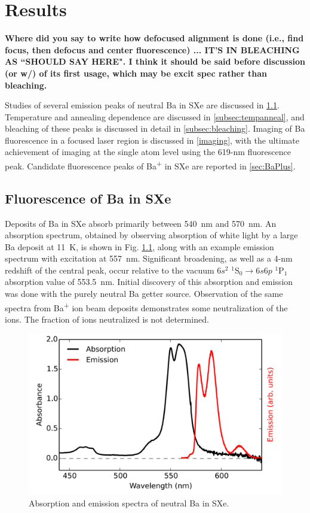 \chapter{Results}

\textbf{\color{red}Where did you say to write how defocused alignment is done (i.e., find focus, then defocus and center fluorescence) ... IT'S IN BLEACHING AS ``SHOULD SAY HERE".  I think it should be said before discussion (or w/) of its first usage, which may be excit spec rather than bleaching.}

Studies of several emission peaks of neutral Ba in SXe are discussed in \ref{sec:fluorescence}.  Temperature and annealing dependence are discussed in \ref{subsec:tempanneal}, and bleaching of these peaks is discussed in detail in \ref{subsec:bleaching}.  Imaging of Ba fluorescence in a focused laser region is discussed in \ref{imaging}, with the ultimate achievement of imaging at the single atom level using the 619-nm fluorescence peak.  Candidate fluorescence peaks of Ba\textsuperscript{+} in SXe are reported in \ref{sec:BaPlus}.

\section{Fluorescence of Ba in SXe}
\label{sec:fluorescence}

Deposits of Ba in SXe absorb primarily between 540~nm and 570~nm.  An absorption spectrum, obtained by observing absorption of white light by a large Ba deposit at 11~K, is shown in Fig. \ref{fig:BaAbs}, along with an example emission spectrum with excitation at 557~nm.  Significant broadening, as well as a 4-nm redshift  of the central peak, occur relative to the vacuum $6s^{2}$ $^{1}$S$_{0} \rightarrow 6s6p$ $^{1}$P$_{1}$ absorption value of 553.5~nm.  Initial discovery of this absorption and emission was done with the purely neutral Ba getter source.  Observation of the same spectra from Ba\textsuperscript{+} ion beam deposits demonstrates some neutralization of the ions.  The fraction of ions neutralized is not determined.  \cite{Mong2015,Shon,Brian}

\begin{figure} %
        \centering
                \includegraphics[width=.7\textwidth]{figures/BaAbs_fromBaSpec.png}
                \caption{Absorption and emission spectra of neutral Ba in SXe.  \cite{Mong2015}}
\label{fig:BaAbs}
\end{figure}

